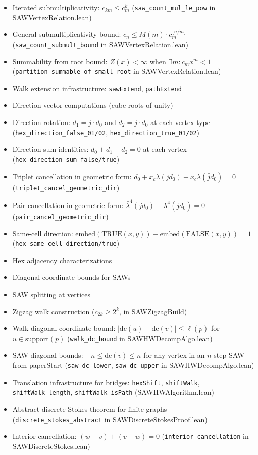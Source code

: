 \begin{lemma}
\begin{itemize}
\item Iterated submultiplicativity: $c_{km} \leq c_m^k$ (\texttt{saw\_count\_mul\_le\_pow}
  in SAWVertexRelation.lean)
\item General submultiplicativity bound: $c_n \leq M(m) \cdot c_m^{\lfloor n/m \rfloor}$
  (\texttt{saw\_count\_submult\_bound} in SAWVertexRelation.lean)
\item Summability from root bound: $Z(x) < \infty$ when $\exists m: c_m x^m < 1$
  (\texttt{partition\_summable\_of\_small\_root} in SAWVertexRelation.lean)
\item Walk extension infrastructure: \texttt{sawExtend}, \texttt{pathExtend}
\item Direction vector computations (cube roots of unity)
\item Direction rotation: $d_1 = j \cdot d_0$ and $d_2 = \bar{j} \cdot d_0$ at each vertex type
  (\texttt{hex\_direction\_false\_01/02}, \texttt{hex\_direction\_true\_01/02})
\item Direction sum identities: $d_0 + d_1 + d_2 = 0$ at each vertex
  (\texttt{hex\_direction\_sum\_false/true})
\item Triplet cancellation in geometric form: $d_0 + x_c \bar{\lambda} (j d_0) + x_c \lambda (\bar{j} d_0) = 0$
  (\texttt{triplet\_cancel\_geometric\_dir})
\item Pair cancellation in geometric form: $\bar{\lambda}^4 (j d_0) + \lambda^4 (\bar{j} d_0) = 0$
  (\texttt{pair\_cancel\_geometric\_dir})
\item Same-cell direction: $\mathrm{embed}(\mathrm{TRUE}(x,y)) - \mathrm{embed}(\mathrm{FALSE}(x,y)) = 1$
  (\texttt{hex\_same\_cell\_direction/true})
\item Hex adjacency characterizations
\item Diagonal coordinate bounds for SAWs
\item SAW splitting at vertices
\item Zigzag walk construction ($c_{2k} \geq 2^k$, in SAWZigzagBuild)
\item Walk diagonal coordinate bound: $|\mathrm{dc}(u) - \mathrm{dc}(v)| \leq \ell(p)$ for $u \in \mathrm{support}(p)$
  (\texttt{walk\_dc\_bound} in SAWHWDecompAlgo.lean)
\item SAW diagonal bounds: $-n \leq \mathrm{dc}(v) \leq n$ for any vertex in an $n$-step SAW from paperStart
  (\texttt{saw\_dc\_lower}, \texttt{saw\_dc\_upper} in SAWHWDecompAlgo.lean)
\item Translation infrastructure for bridges: \texttt{hexShift}, \texttt{shiftWalk},
  \texttt{shiftWalk\_length}, \texttt{shiftWalk\_isPath} (SAWHWAlgorithm.lean)
\item Abstract discrete Stokes theorem for finite graphs (\texttt{discrete\_stokes\_abstract}
  in SAWDiscreteStokesProof.lean)
\item Interior cancellation: $(w-v) + (v-w) = 0$ (\texttt{interior\_cancellation}
  in SAWDiscreteStokes.lean)
\end{itemize}


\end{lemma}
